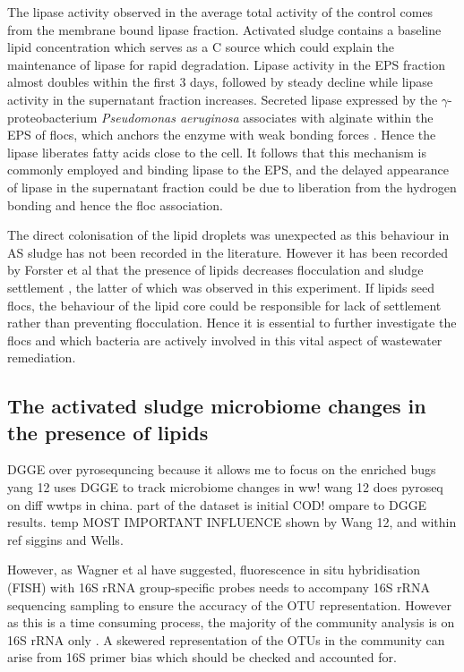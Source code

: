 \documentclass[11pt]{article}
\begin{document}
The lipase activity observed in the average total activity of the control comes from the membrane bound lipase fraction. Activated sludge contains a baseline lipid concentration which serves as a C source which could explain the maintenance of lipase for rapid degradation. Lipase activity in the EPS fraction almost doubles within the first 3 days, followed by steady decline while lipase activity in the supernatant fraction increases. Secreted lipase expressed by the \emph{$\gamma$}-proteobacterium \textit{Pseudomonas aeruginosa} associates with alginate within the EPS of flocs, which anchors the enzyme with weak bonding forces \cite{mayer1999role,wicker1987}. Hence the lipase  liberates fatty acids close to the cell. It follows that this mechanism is commonly employed and binding lipase to the EPS, and the delayed appearance of lipase in the supernatant fraction could be due to liberation from the hydrogen bonding and hence the floc association.

The direct colonisation of the lipid droplets was unexpected as this behaviour in AS sludge has not been recorded in the literature. However it has been recorded by Forster et al that the presence of lipids decreases flocculation and sludge settlement \cite{Forster_92}, the latter of which was observed in this experiment. If lipids seed flocs, the behaviour of the lipid core could be responsible for lack of settlement rather than preventing flocculation. Hence it is essential to further investigate the flocs and which bacteria are actively involved in this vital aspect of wastewater remediation.


\subsection{The activated sludge microbiome changes in the presence of lipids}
DGGE over pyrosequncing because it allows me to focus on the enriched bugs
yang 12 uses DGGE to track microbiome changes in ww!
wang 12 does pyroseq on diff wwtps in china. part of the dataset is initial COD! ompare to DGGE results. temp MOST IMPORTANT INFLUENCE shown by Wang 12, and within ref siggins and Wells.

However, as Wagner et al have suggested, fluorescence in situ hybridisation (FISH) with 16S rRNA  group-specific probes needs to accompany 16S rRNA sequencing sampling to ensure the accuracy of the OTU representation. However as this is a time consuming process, the majority of the community analysis is on 16S rRNA only \cite{Wagner_02} . A skewered representation of the OTUs in the community can arise from 16S primer bias which should be checked and accounted for.
\end{document}
